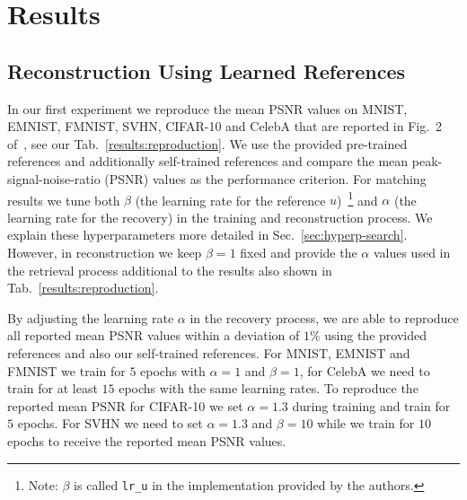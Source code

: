 \section{Results}


\subsection{Reconstruction Using Learned References}


In our first experiment we reproduce the mean PSNR values on MNIST,
EMNIST, FMNIST, SVHN, CIFAR-10 and CelebA that are reported in
Fig.~2 of~\cite{hyder2020solving}, see our
Tab.~\ref{results:reproduction}. We use the provided
pre-trained references and additionally self-trained references and
compare the mean peak-signal-noise-ratio (PSNR) values as the performance criterion.
For matching results we tune both $\beta$ (the learning rate for
the reference $u$)~\footnote{Note: $\beta$ is called \texttt{lr\_u} in
  the implementation provided by the authors.} and $\alpha$ (the
learning rate for the recovery) in the training and reconstruction
process. We explain these hyperparameters more detailed in
 Sec.~\ref{sec:hyperp-search}. However, in reconstruction we keep
 $\beta = 1$ fixed and provide the $\alpha$ values used in the retrieval
 process additional to the results also shown in Tab.~\ref{results:reproduction}.

By adjusting the learning rate $\alpha$ in the recovery process, we
are able to reproduce all reported mean PSNR values within a deviation
of $1\%$ using the provided references and also our self-trained references. For MNIST, EMNIST and FMNIST we train for $5$ epochs with $\alpha = 1$ and $\beta = 1$, for CelebA we need to train for at least $15$ epochs with the same learning rates. To reproduce the reported mean PSNR for CIFAR-10 we set $\alpha=1.3$ during training and train for $5$ epochs. For SVHN we need to set $\alpha=1.3$ and $\beta=10$ while we train for $10$ epochs to receive the reported mean PSNR values.

